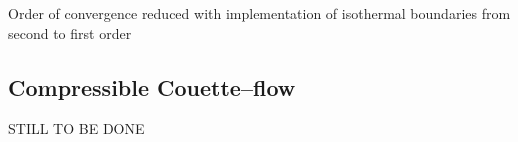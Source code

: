 \documentclass{report}
\begin{document}
Order of convergence reduced with implementation of isothermal boundaries from second to first order \cite{Cleary1999}

\subsection{Compressible Couette--flow}
STILL TO BE DONE

\end{document}
